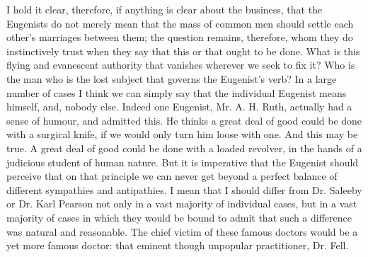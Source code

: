 \documentclass{book}
\begin{document}
I hold it clear, therefore, if anything is clear about the business, that the Eugenists do not merely mean that the mass of common men should settle each other’s marriages between them; the question remains, therefore, whom they do instinctively trust when they say that this or that ought to be done. What is this flying and evanescent authority that vanishes wherever we seek to fix it? Who is the man who is the lost subject that governs the Eugenist’s verb? In a large number of cases I think we can simply say that the individual Eugenist means himself, and, nobody else. Indeed one Eugenist, Mr. A. H. Ruth, actually had a sense of humour, and admitted this. He thinks a great deal of good could be done with a surgical knife, if we would only turn him loose with one. And this may be true. A great deal of good could be done with a loaded revolver, in the hands of a judicious student of human nature. But it is imperative that the Eugenist should perceive that on that principle we can never get beyond a perfect balance of different sympathies and antipathies. I mean that I should differ from Dr. Saleeby or Dr. Karl Pearson not only in a vast majority of individual cases, but in a vast majority of cases in which they would be bound to admit that such a difference was natural and reasonable. The chief victim of these famous doctors would be a yet more famous doctor: that eminent though unpopular practitioner, Dr. Fell.
\end{document}
